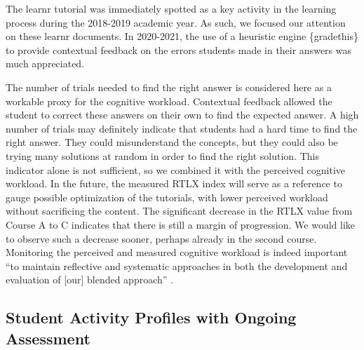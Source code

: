 \documentclass{aims} %
\theoremstyle{definition}
\begin{document}
The learnr tutorial was immediately spotted as a key activity in the
learning process during the 2018-2019 academic year. As such, we focused
our attention on these learnr documents. In 2020-2021, the use of a
heuristic engine \{gradethis\} to provide contextual feedback on the
errors students made in their answers was much appreciated.

The number of trials needed to find the right answer is considered here
as a workable proxy for the cognitive workload. Contextual feedback
allowed the student to correct these answers on their own to find the
expected answer. A high number of trials may definitely indicate that
students had a hard time to find the right answer. They could
misunderstand the concepts, but they could also be trying many solutions
at random in order to find the right solution. This indicator alone is
not sufficient, so we combined it with the perceived cognitive workload.
In the future, the measured RTLX index will serve as a reference to
gauge possible optimization of the tutorials, with lower perceived
workload without sacrificing the content. The significant decrease in
the RTLX value from Course A to C indicates that there is still a margin
of progression. We would like to observe such a decrease sooner, perhaps
already in the second course. Monitoring the perceived and measured
cognitive workload is indeed important ``to maintain reflective and
systematic approaches in both the development and evaluation of
{[}our{]} blended approach'' \cite{Spadafora2018}.

\hypertarget{student-activity-profiles-with-ongoing-assessment-1}{%
\subsection{Student Activity Profiles with Ongoing
Assessment}\label{student-activity-profiles-with-ongoing-assessment-1}}
\end{document}
